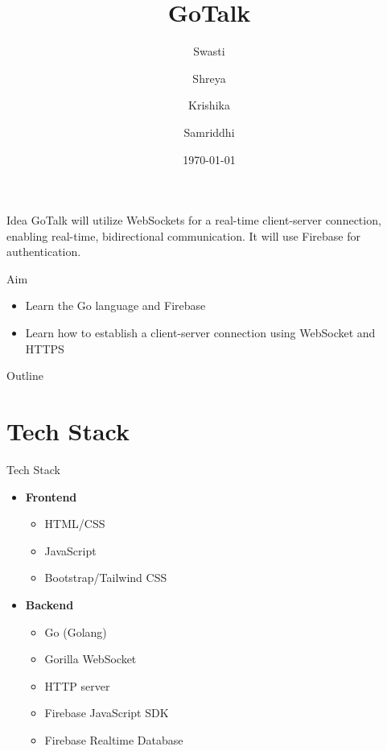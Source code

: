\documentclass{beamer}
\title{GoTalk}
\author{Swasti \and Shreya \and Krishika \and Samriddhi}
\date{\today}
\begin{document}
\begin{frame}
    \titlepage
\end{frame}

\begin{frame}{Idea}
    GoTalk will utilize WebSockets for a real-time client-server connection, enabling real-time, bidirectional communication. It will use Firebase for authentication.
\end{frame}

\begin{frame}{Aim}
    \begin{itemize}
        \item Learn the Go language and Firebase
        \item Learn how to establish a client-server connection using WebSocket and HTTPS
    \end{itemize}
\end{frame}

\begin{frame}{Outline}
    \tableofcontents
\end{frame}

\section{Tech Stack}
\begin{frame}{Tech Stack}
    \begin{itemize}
        \item \textbf{Frontend}
        \begin{itemize}
            \item HTML/CSS
            \item JavaScript
            \item Bootstrap/Tailwind CSS
        \end{itemize}
        \item \textbf{Backend}
        \begin{itemize}
            \item Go (Golang)
            \item Gorilla WebSocket
            \item HTTP server
            \item Firebase JavaScript SDK
            \item Firebase Realtime Database
        \end{itemize}
    \end{itemize}
\end{frame}
\end{document}
